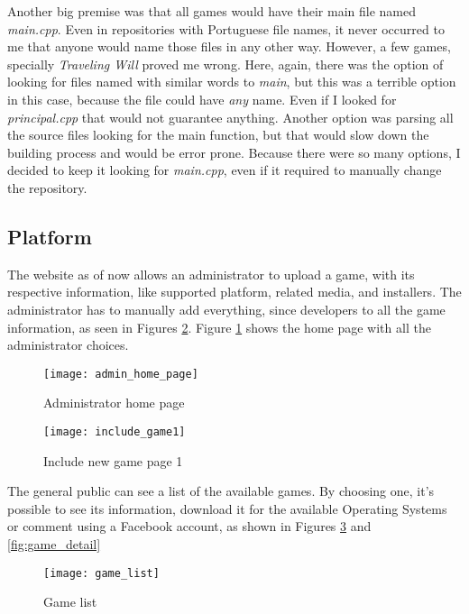 Another big premise was that all games would have their main file named \textit{main.cpp}. Even in repositories with Portuguese file names, it never occurred to me that anyone would name those files in any other way. However, a few games, specially \textit{Traveling Will} proved me wrong. Here, again, there was the option of looking for files named with similar words to \textit{main}, but this was a terrible option in this case, because the file could have \textit{any} name. Even if I looked for \textit{principal.cpp} that would not guarantee anything. Another option was parsing all the source files looking for the main function, but that would slow down the building process and would be error prone. Because there were so many options, I decided to keep it looking for \textit{main.cpp}, even if it required to manually change the repository.

\subsection[Platform]{Platform}

The website as of now allows an administrator to upload a game, with its respective information, like supported platform, related media, and installers.
The administrator has to manually add everything, since developers to all the game information, as seen in Figures \ref{fig:include_game1}. Figure \ref{fig:admin_home} shows the home page with all the administrator choices.

\begin{figure}[h!]
\centering
\texttt{[image: admin\_home\_page]}
\caption{Administrator home page}
\label{fig:admin_home}
\end{figure}

\begin{figure}[h!]
\centering
\texttt{[image: include\_game1]}
\caption{Include new game page 1}
\label{fig:include_game1}
\end{figure}

The general public can see a list of the available games. By choosing one, it's possible to see its information, download it for the available Operating Systems or comment using a Facebook account, as shown in Figures \ref{fig:game_list} and \ref{fig:game_detail}

\begin{figure}[h!]
\centering
\texttt{[image: game\_list]}
\caption{Game list}
\label{fig:game_list}
\end{figure}


